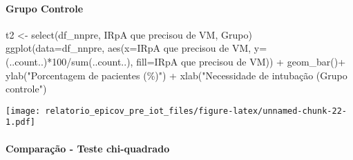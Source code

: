 \documentclass[
]{article}
\newenvironment{Shaded}{\begin{snugshade}}{\end{snugshade}}
\newcommand{\AttributeTok}[1]{\textcolor[rgb]{0.77,0.63,0.00}{#1}}
\newcommand{\DecValTok}[1]{\textcolor[rgb]{0.00,0.00,0.81}{#1}}
\newcommand{\FunctionTok}[1]{\textcolor[rgb]{0.00,0.00,0.00}{#1}}
\newcommand{\NormalTok}[1]{#1}
\newcommand{\OtherTok}[1]{\textcolor[rgb]{0.56,0.35,0.01}{#1}}
\newcommand{\SpecialCharTok}[1]{\textcolor[rgb]{0.00,0.00,0.00}{#1}}
\newcommand{\StringTok}[1]{\textcolor[rgb]{0.31,0.60,0.02}{#1}}
\begin{document}
\hypertarget{grupo-controle-4}{%
\paragraph{\texorpdfstring{\textbf{Grupo
Controle}}{Grupo Controle}}\label{grupo-controle-4}}

\begin{Shaded}
\begin{Highlighting}[]
\NormalTok{t2 }\OtherTok{\textless{}{-}} \FunctionTok{select}\NormalTok{(df\_nnpre, }\StringTok{\textasciigrave{}}\AttributeTok{IRpA que precisou de VM}\StringTok{\textasciigrave{}}\NormalTok{, Grupo)}
\FunctionTok{ggplot}\NormalTok{(}\AttributeTok{data=}\NormalTok{df\_nnpre, }\FunctionTok{aes}\NormalTok{(}\AttributeTok{x=}\StringTok{\textasciigrave{}}\AttributeTok{IRpA que precisou de VM}\StringTok{\textasciigrave{}}\NormalTok{, }\AttributeTok{y=}\NormalTok{(..count..)}\SpecialCharTok{*}\DecValTok{100}\SpecialCharTok{/}\FunctionTok{sum}\NormalTok{(..count..), }\AttributeTok{fill=}\StringTok{\textasciigrave{}}\AttributeTok{IRpA que precisou de VM}\StringTok{\textasciigrave{}}\NormalTok{)) }\SpecialCharTok{+}
  \FunctionTok{geom\_bar}\NormalTok{()}\SpecialCharTok{+}
  \FunctionTok{ylab}\NormalTok{(}\StringTok{"Porcentagem de pacientes (\%)"}\NormalTok{) }\SpecialCharTok{+}
  \FunctionTok{xlab}\NormalTok{(}\StringTok{"Necessidade de intubação (Grupo controle"}\NormalTok{)}
\end{Highlighting}
\end{Shaded}

\texttt{[image: relatorio\_epicov\_pre\_iot\_files/figure-latex/unnamed-chunk-22-1.pdf]}

\hypertarget{comparauxe7uxe3o---teste-chi-quadrado}{%
\paragraph{\texorpdfstring{\textbf{Comparação - Teste
chi-quadrado}}{Comparação - Teste chi-quadrado}}\label{comparauxe7uxe3o---teste-chi-quadrado}}

\begin{Shaded}
\end{Shaded}
\end{document}
